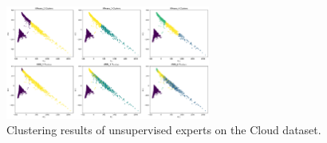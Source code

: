 \documentclass{article}
\begin{document}
\begin{enumerate}
\begin{enumerate}
        \begin{figure}[ht]
          \centering
          \includegraphics[width=0.6\textwidth]{cloud_off.png}
          \caption{Clustering results of unsupervised experts on the Cloud dataset.}
          \label{fig:cloud_off}
        \end{figure}
    \end{enumerate}
    

\end{enumerate}
\end{document}
